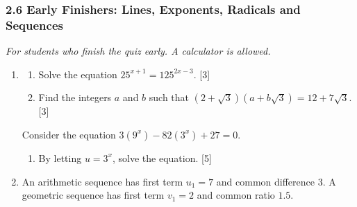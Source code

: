 \documentclass[12pt, twoside]{article}
\begin{document}
\subsubsection*{2.6 Early Finishers: Lines, Exponents, Radicals and Sequences}

\emph{For students who finish the quiz early. A calculator is allowed.}

\begin{enumerate}[itemsep=0.15cm]

\item[1.] [Maximum mark: 11]

\begin{enumerate}[itemsep=0.1cm]
  \item Solve the equation $25^{x + 1} = 125^{2x - 3}$. \hfill [3]
  \item Find the integers $a$ and $b$ such that
  $\left(2 + \sqrt{3}\right)\left(a + b\sqrt{3}\right) = 12 + 7\sqrt{3}$.
  \hfill [3]
\end{enumerate}

Consider the equation $3\left(9^{x}\right) - 82\left(3^{x}\right) + 27 = 0$.

\begin{enumerate}[itemsep=0.1cm]
  \item[(c)] By letting $u = 3^{x}$, solve the equation. \hfill [5]
\end{enumerate}


\newpage

\item[2.] [Maximum mark: 8]

An arithmetic sequence has first term $u_{1} = 7$ and common difference
$3$. A geometric sequence has first term $v_{1} = 2$ and common ratio
$1.5$.


\end{enumerate}
\end{document}
